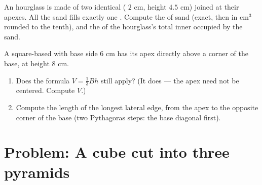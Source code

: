 \begin{exercise}[$\star\star$]\label{exo:g8:solids:10}
An hourglass is made of two identical  ( $2$ cm, height
$4.5$ cm) joined at their apexes. All the sand fills exactly one
. Compute the  of sand (exact, then in cm$^3$ rounded to
the tenth), and the  of the hourglass's total inner 
occupied by the sand.
\end{exercise}

\begin{exercise}[$\star\star\star$]\label{exo:g8:solids:11}
A square-based  with base side $6$ cm has its apex directly
above a corner of the base, at height $8$ cm.
\begin{enumerate}
  \item Does the formula $V = \frac13 Bh$ still apply? (It does ---
        the apex need not be centered. Compute $V$.)
  \item Compute the length of the longest lateral edge, from the apex
        to the opposite corner of the base (two Pythagoras steps: the
        base diagonal first).
\end{enumerate}
\end{exercise}

\section{Problem: A cube cut into three pyramids}

